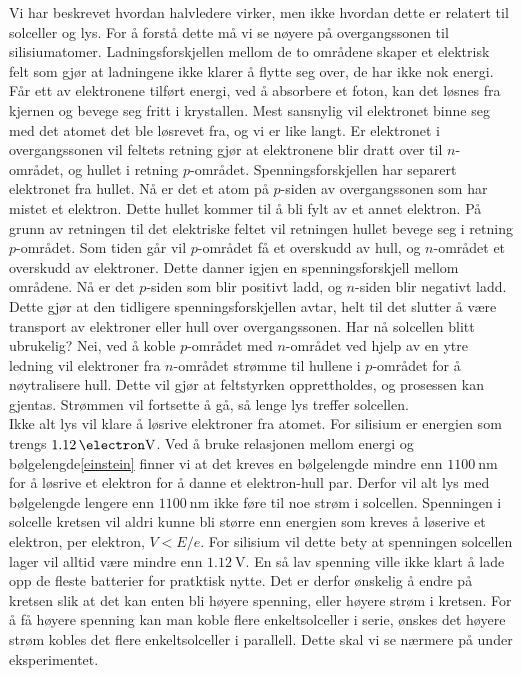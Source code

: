 \documentclass[%
 reprint,
 amsmath,amssymb,
 aps,
 norsk,
 booktabs
]{revtex4-1}
\begin{document}
Vi har beskrevet hvordan halvledere virker, men ikke hvordan dette er relatert til solceller og lys. For å  forstå dette må vi se nøyere på overgangssonen til silisiumatomer. Ladningsforskjellen mellom de to områdene skaper et elektrisk felt som gjør at ladningene ikke klarer å flytte seg over, de har ikke nok energi. Får ett av elektronene tilført energi, ved å absorbere et foton, kan det løsnes fra kjernen og bevege seg fritt i krystallen. Mest sansnylig vil elektronet binne seg med det atomet det ble løsrevet fra, og vi er like langt. Er elektronet i overgangssonen vil feltets retning gjør at elektronene blir dratt over til $n$-området, og hullet i retning $p$-området. Spenningsforskjellen har separert elektronet fra hullet. Nå er det et atom på $p$-siden av overgangssonen som har mistet et elektron. Dette hullet kommer til å bli fylt av et annet elektron. På grunn av retningen til det elektriske feltet vil retningen hullet bevege seg i retning $p$-området. Som tiden går vil $p$-området få et overskudd av hull, og $n$-området et overskudd av elektroner. Dette danner igjen en spenningsforskjell mellom områdene. Nå er det $p$-siden som blir positivt ladd, og $n$-siden blir negativt ladd. Dette gjør at den tidligere spenningsforskjellen avtar, helt til det slutter å være transport av elektroner eller hull over overgangssonen. Har nå solcellen blitt ubrukelig? Nei, ved å koble $p$-området med $n$-området ved hjelp av en ytre ledning vil elektroner fra $n$-området strømme til hullene i $p$-området for å nøytralisere hull. Dette vil gjør at feltstyrken opprettholdes, og prosessen kan gjentas. Strømmen vil fortsette å gå, så lenge lys treffer solcellen.\\ Ikke alt lys vil klare å løsrive elektroner fra atomet. For silisium er energien som trengs $\SI{1.12}{\electron\volt}$. Ved å bruke relasjonen mellom energi og bølgelengde\eqref{einstein} finner vi at det kreves en bølgelengde mindre enn $\SI{1100}{\nano\meter}$ for å løsrive et elektron for å danne et elektron-hull par. Derfor vil alt lys med bølgelengde lengere enn $\SI{1100}{\nano\meter}$ ikke føre til noe strøm i solcellen. Spenningen i solcelle kretsen vil aldri kunne bli større enn energien som kreves å løserive et elektron, per elektron, $V<E/e$. For silisium vil dette bety at spenningen solcellen lager vil alltid være mindre enn $\SI{1.12}{\volt}$.
En så lav spenning ville ikke klart å lade opp de fleste batterier for pratktisk nytte. Det er derfor ønskelig å endre på kretsen slik at det kan enten bli høyere spenning, eller høyere strøm i kretsen. For å få høyere spenning kan man koble flere enkeltsolceller i serie, ønskes det høyere strøm kobles det flere enkeltsolceller i parallell. Dette skal vi se nærmere på under eksperimentet.
\end{document}
